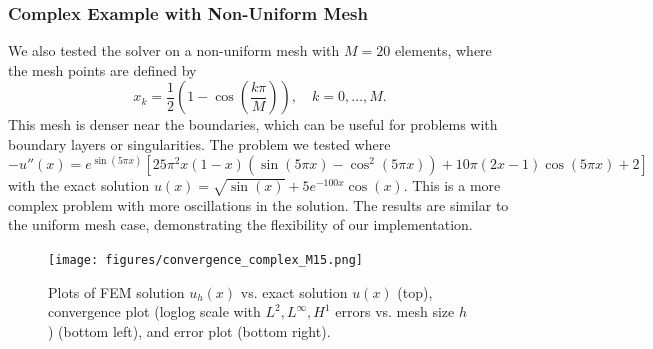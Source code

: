 \documentclass[a4paper,10pt]{article}
\begin{document}
\subsubsection*{Complex Example with Non-Uniform Mesh}
We also tested the solver on a non-uniform mesh with $M=20$ elements, where the mesh points are defined by
\[
	x_k = \frac{1}{2}\left(1-\cos\left(\frac{k\pi}{M}\right)\right), \quad k=0,\ldots,M.
\]
This mesh is denser near the boundaries, which can be useful for problems with boundary layers or singularities. 
The problem we tested where
\[
	-u''(x) = e^{\sin(5\pi x)}\left[25\pi^2 x(1-x)(\sin(5\pi x) - \cos^2(5\pi x)) + 10\pi (2x-1)\cos(5\pi x) + 2\right]
\]
with the exact solution
\(
	u(x) =\sqrt{\sin(x)} + 5e^{-100x}\cos(x).
\)
This is a more complex problem with more oscillations in the solution.
The results are similar to the uniform mesh case, demonstrating the flexibility of our implementation.
\begin{figure}[H]
	\centering
	\texttt{[image: figures/convergence\_complex\_M15.png]}
	\caption{Plots of FEM solution \(u_h(x)\) vs. exact solution \(u(x)\) (top),
		convergence plot (loglog scale with $L^2, L^\infty, H^1$ errors vs. mesh size $h$) (bottom left),
		and error plot (bottom right).}
	\label{fig:solution_complex}
\end{figure}
\end{document}
